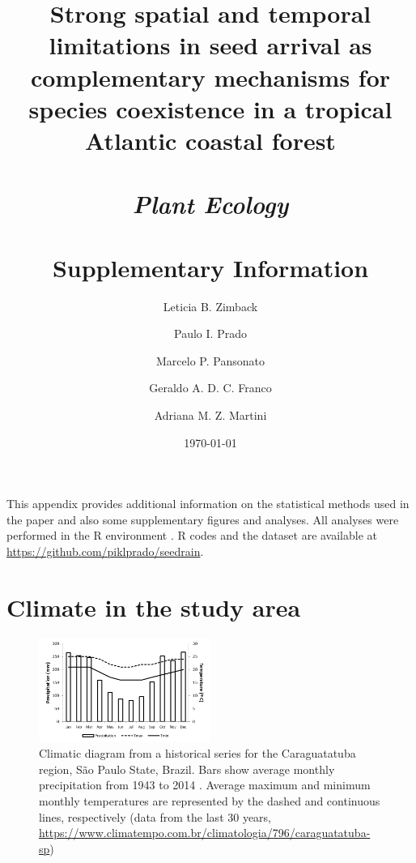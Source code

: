 \documentclass[A4]{article}
\begin{document}
\title{Strong spatial and temporal limitations in seed arrival as
  complementary mechanisms for species coexistence in a tropical
  Atlantic coastal forest \\ \ \\
  \emph{Plant Ecology} \\ \ \\
  \Large Supplementary Information} 

\author[1,2]{Leticia B. Zimback}
\author[2]{Paulo I. Prado}
\author[2]{Marcelo P. Pansonato}
\author[3]{Geraldo A. D. C. Franco}
\author[2,4]{Adriana M. Z. Martini}



\date{\today}

\maketitle

This appendix provides additional information on the statistical
methods used in the paper and also some supplementary figures and
analyses. All analyses were performed in the R environment
\cite{Rcore}.  R codes and the dataset are available at
\url{https://github.com/piklprado/seedrain}.


\section*{Climate in the study area}

\begin{figure}[!htb]
  \centering
  \includegraphics[width=0.5\textwidth]{../figures/climate_diagram}
  \caption{Climatic diagram from a historical series for the
    Caraguatatuba region, São Paulo State, Brazil. Bars show average
    monthly precipitation from 1943 to 2014 \cite{Santos2019}. Average
    maximum and minimum monthly temperatures are represented by the
    dashed and continuous lines, respectively (data from the last 30
    years, \protect\url{https://www.climatempo.com.br/climatologia/796/caraguatatuba-sp})}
  \label{fig:climate_diag}
\end{figure}
\end{document}
